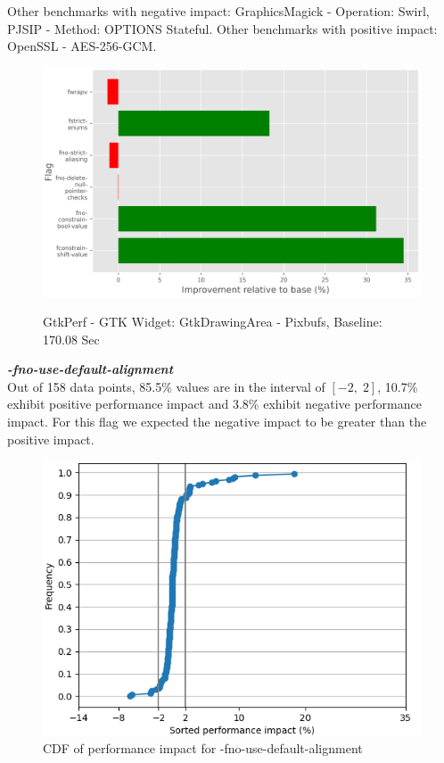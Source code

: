 \documentclass{sciposter}
\begin{document}
\begin{multicols}{3}
Other benchmarks with negative impact: GraphicsMagick - Operation: Swirl, PJSIP
- Method: OPTIONS Stateful. Other benchmarks with positive impact: OpenSSL -
AES-256-GCM.

\begin{figure}[h!]
\centering
\includegraphics[scale=1.3]{gtkperf} \\
\caption{GtkPerf - GTK Widget: GtkDrawingArea - Pixbufs, Baseline: 170.08 Sec}
\label{fig:gtkperf}
\end{figure}

\textbf{\textit{-fno-use-default-alignment}} \\
Out of 158 data points, 85.5\% values are in the interval of \( [-2,\;2] \), 
10.7\% exhibit positive performance impact and 3.8\% exhibit negative
performance impact. For this flag we expected the negative impact to be greater
than the positive impact.

\begin{figure}[h!]
\centering
\includegraphics[scale=1.2]{fno-use-default-alignment}
\caption{CDF of performance impact for -fno-use-default-alignment}
\end{figure}


\end{multicols}
\end{document}
